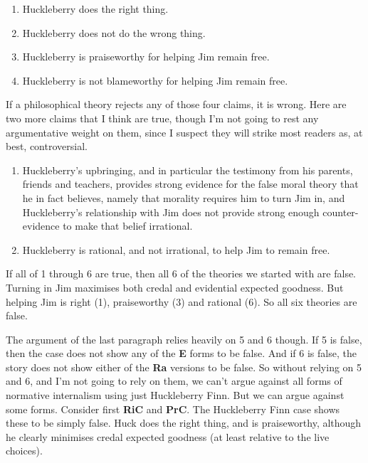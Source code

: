 \documentclass[
  10pt,
  letterpaper,
  twoside]{scrbook}
\providecommand{\tightlist}{%
  \setlength{\itemsep}{0pt}\setlength{\parskip}{0pt}}\usepackage{longtable,booktabs,array}
\begin{document}
\begin{enumerate}
\def\labelenumi{\arabic{enumi}.}
\tightlist
\item
  {Huck}leberry does the right thing.
\item
  {Huck}leberry does not do the wrong thing.
\item
  {Huck}leberry is praiseworthy for helping Jim remain free.
\item
  {Huck}leberry is not blameworthy for helping Jim remain free.
\end{enumerate}

If a philosophical theory rejects any of those four claims, it is wrong.
Here are two more claims that I think are true, though I'm not going to
rest any argumentative weight on them, since I suspect they will strike
most readers as, at best, controversial.

\begin{enumerate}
\def\labelenumi{\arabic{enumi}.}
\setcounter{enumi}{4}
\tightlist
\item
  Huckleberry's upbringing, and in particular the testimony from his
  parents, friends and teachers, provides strong evidence for the false
  moral theory that he in fact believes, namely that morality requires
  him to turn Jim in, and Huckleberry's relationship with Jim does not
  provide strong enough counter-evidence to make that belief irrational.
\item
  Huckleberry is rational, and not irrational, to help Jim to remain
  free.
\end{enumerate}

If all of 1 through 6 are true, then all 6 of the theories we started
with are false. Turning in Jim maximises both credal and evidential
expected goodness. But helping Jim is right (1), praiseworthy (3) and
rational (6). So all six theories are false.

The argument of the last paragraph relies heavily on 5 and 6 though. If
5 is false, then the case does not show any of the \textbf{E} forms to
be false. And if 6 is false, the story does not show either of the
\textbf{Ra} versions to be false. So without relying on 5 and 6, and I'm
not going to rely on them, we can't argue against all forms of normative
internalism using just {Huck}leberry Finn. But we can argue against some
forms. Consider first \textbf{RiC} and \textbf{PrC}. The {Huck}leberry
Finn case shows these to be simply false. {Huck} does the right thing,
and is praiseworthy, although he clearly minimises credal expected
goodness (at least relative to the live choices).
\end{document}
